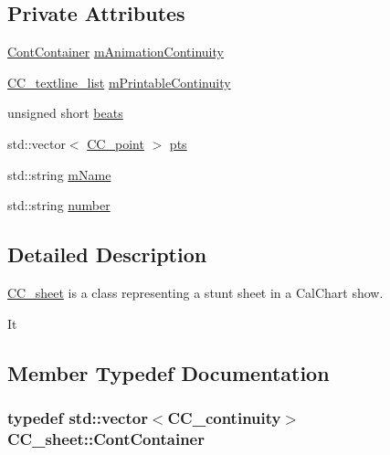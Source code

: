 \subsection*{Private Attributes}
\begin{DoxyCompactItemize}
\item 
\hyperlink{a00045_a057981286a04d0a0bf0b7ecbdd5e1bcd}{Cont\-Container} \hyperlink{a00045_a48691d0c3f157765c1b6448e572f3e0e}{m\-Animation\-Continuity}
\item 
\hyperlink{a00212_ae492d9b165445899a5c5a3128e58f0cf}{C\-C\-\_\-textline\-\_\-list} \hyperlink{a00045_aa55d5937b4aa3bf410c598d0b73e937c}{m\-Printable\-Continuity}
\item 
unsigned short \hyperlink{a00045_ae0a4f2825ed321a631bd179ee97ce990}{beats}
\item 
std\-::vector$<$ \hyperlink{a00034}{C\-C\-\_\-point} $>$ \hyperlink{a00045_a518af96eb5163fccb757e5f1d23fef17}{pts}
\item 
std\-::string \hyperlink{a00045_a8eee8546bf15f01705734cddaf7e1866}{m\-Name}
\item 
std\-::string \hyperlink{a00045_a075899cc4758e99aa40c51005c2b6458}{number}
\end{DoxyCompactItemize}


\subsection{Detailed Description}
\hyperlink{a00045}{C\-C\-\_\-sheet} is a class representing a stunt sheet in a Cal\-Chart show. 

It 

\subsection{Member Typedef Documentation}
\hypertarget{a00045_a057981286a04d0a0bf0b7ecbdd5e1bcd}{
\subsubsection[{Cont\-Container}]{\setlength{\rightskip}{0pt plus 5cm}typedef std\-::vector$<${\bf C\-C\-\_\-continuity}$>$ {\bf C\-C\-\_\-sheet\-::\-Cont\-Container}\hspace{0.3cm}{\ttfamily [private]}}}\label{a00045_a057981286a04d0a0bf0b7ecbdd5e1bcd}


